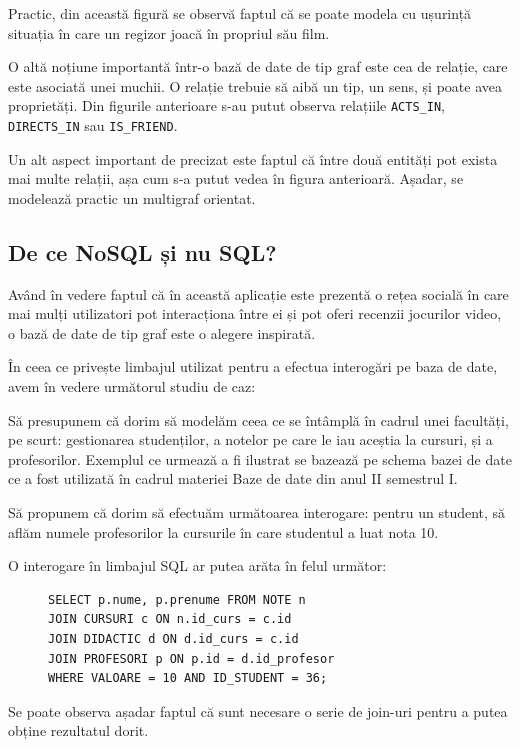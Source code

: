 \documentclass[12pt,a4paper]{report}
\begin{document}
Practic, din această figură se observă faptul că se poate modela cu ușurință situația în care un regizor joacă în propriul său film.

O altă noțiune importantă într-o bază de date de tip graf este cea de relație, care este asociată unei muchii. 
O relație trebuie să aibă un tip, un sens, și poate avea proprietăți.
Din figurile anterioare s-au putut observa relațiile \texttt{ACTS\_IN}, \texttt{DIRECTS\_IN} sau \texttt{IS\_FRIEND}.

Un alt aspect important de precizat este faptul că între două entități pot exista mai multe relații, așa cum s-a putut vedea în figura anterioară. Așadar, se modelează practic un multigraf orientat.

\subsection{De ce NoSQL și nu SQL?}

Având în vedere faptul că în această aplicație este prezentă o rețea socială în care mai mulți utilizatori pot interacționa între ei și pot oferi recenzii jocurilor video, o bază de date de tip graf este o alegere inspirată.

În ceea ce privește limbajul utilizat pentru a efectua interogări pe baza de date, avem în vedere următorul studiu de caz:

Să presupunem că dorim să modelăm ceea ce se întâmplă în cadrul unei facultăți, pe scurt: gestionarea studenților, a notelor pe care le iau aceștia la cursuri, și a profesorilor.
Exemplul ce urmează a fi ilustrat se bazează pe schema bazei de date ce a fost utilizată în cadrul materiei Baze de date din anul II semestrul I. \cite{7}

Să propunem că dorim să efectuăm următoarea interogare: pentru un student, să aflăm numele profesorilor la cursurile în care studentul a luat nota 10.

O interogare în limbajul SQL ar putea arăta în felul următor:

\begin{figure}[h]
\centering
\begin{BVerbatim}
SELECT p.nume, p.prenume FROM NOTE n 
JOIN CURSURI c ON n.id_curs = c.id
JOIN DIDACTIC d ON d.id_curs = c.id
JOIN PROFESORI p ON p.id = d.id_profesor
WHERE VALOARE = 10 AND ID_STUDENT = 36;
\end{BVerbatim}
\end{figure}


Se poate observa așadar faptul că sunt necesare o serie de join-uri pentru a putea obține rezultatul dorit.
\end{document}
